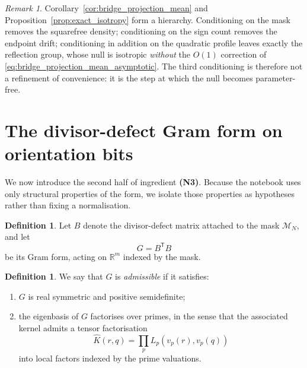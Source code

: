\documentclass[11pt]{amsart}
\numberwithin{equation}{section}
\theoremstyle{plain}
\theoremstyle{definition}
\newtheorem{definition}[theorem]{Definition}
\theoremstyle{remark}
\newtheorem{remark}[theorem]{Remark}
\begin{document}
\begin{remark}
\label{rem:hierarchy_of_nulls}
Corollary~\ref{cor:bridge_projection_mean} and
Proposition~\ref{prop:exact_isotropy} form a hierarchy. Conditioning on
the mask removes the squarefree density; conditioning on the sign count
removes the endpoint drift; conditioning in addition on the quadratic
profile leaves exactly the reflection group, whose null is isotropic
\emph{without} the $O(1)$ correction of
\eqref{eq:bridge_projection_mean_asymptotic}. The third conditioning is
therefore not a refinement of convenience: it is the step at which the
null becomes parameter-free.
\end{remark}

\section{The divisor-defect Gram form on orientation bits}
\label{sec:gram_form}

We now introduce the second half of ingredient \textbf{(N3)}. Because
the notebook uses only structural properties of the form, we isolate
those properties as hypotheses rather than fixing a normalisation.

\begin{definition}
\label{def:divisor_defect_form}
Let $B$ denote the divisor-defect matrix attached to the mask
$\mathcal{M}_N$, and let
\begin{equation}
G = B^{\mathsf{T}} B
\label{eq:gram_form}
\end{equation}
be its Gram form, acting on $\mathbb{R}^{m}$ indexed by the mask.
\end{definition}

\begin{definition}
\label{def:hypotheses_on_G}
We say that $G$ is \emph{admissible} if it satisfies:
\begin{enumerate}[label=(G\arabic*)]
\item $G$ is real symmetric and positive semidefinite;
\item the eigenbasis of $G$ factorises over primes, in the sense that
the associated kernel admits a tensor factorisation
\begin{equation}
\widehat{K}(r,q) = \prod_{p} L_p\!\left( v_p(r), v_p(q) \right)
\label{eq:tensor_factorisation}
\end{equation}
into local factors indexed by the prime valuations.
\end{enumerate}
\end{definition}
\end{document}
